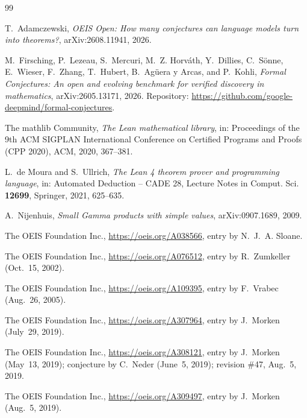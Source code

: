 \documentclass[11pt]{amsart}
\theoremstyle{plain}
\theoremstyle{definition}
\begin{document}
{\small
\begin{thebibliography}{99}

T.~Adamczewski, \emph{OEIS Open: How many conjectures can language models turn into theorems?}, arXiv:2608.11941, 2026.

M.~Firsching, P.~Lezeau, S.~Mercuri, M.~Z. Horv\'ath, Y.~Dillies, C.~S\"onne, E.~Wieser, F.~Zhang, T.~Hubert, B.~Ag\"uera y Arcas, and P.~Kohli, \emph{Formal Conjectures: An open and evolving benchmark for verified discovery in mathematics}, arXiv:2605.13171, 2026. Repository: \url{https://github.com/google-deepmind/formal-conjectures}.

The mathlib Community, \emph{The Lean mathematical library}, in: Proceedings of the 9th ACM SIGPLAN International Conference on Certified Programs and Proofs (CPP 2020), ACM, 2020, 367--381.

L.~de Moura and S.~Ullrich, \emph{The Lean 4 theorem prover and programming language}, in: Automated Deduction -- CADE 28, Lecture Notes in Comput. Sci. \textbf{12699}, Springer, 2021, 625--635.

A.~Nijenhuis, \emph{Small Gamma products with simple values}, arXiv:0907.1689, 2009.

The OEIS Foundation Inc., \url{https://oeis.org/A038566}, entry by N.~J.~A. Sloane.

The OEIS Foundation Inc., \url{https://oeis.org/A076512}, entry by R.~Zumkeller (Oct.~15, 2002).

The OEIS Foundation Inc., \url{https://oeis.org/A109395}, entry by F.~Vrabec (Aug.~26, 2005).

The OEIS Foundation Inc., \url{https://oeis.org/A307964}, entry by J.~Morken (July~29, 2019).

The OEIS Foundation Inc., \url{https://oeis.org/A308121}, entry by J.~Morken (May~13, 2019); conjecture by C.~Neder (June~5, 2019); revision \#47, Aug.~5, 2019.

The OEIS Foundation Inc., \url{https://oeis.org/A309497}, entry by J.~Morken (Aug.~5, 2019).

\end{thebibliography}
}
\end{document}
